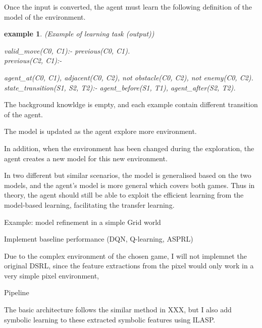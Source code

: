 \documentclass[12pt,twoside]{report}
\newtheorem{examp}{example}[section]
\begin{document}
Once the input is converted, the agent must learn the following definition of the model of the environment.

\begin{examp} (Example of learning task (output))

valid\_move(C0, C1):- previous(C0, C1).
\\
previous(C2, C1):-

agent\_at(C0, C1),
adjacent(C0, C2),
not obstacle(C0, C2),
not enemy(C0, C2).
\\
state\_transition(S1, S2, T2):-
  agent\_before(S1, T1),
  agent\_after(S2, T2).

\end{examp}
\label{learning_task}

The background knowldge is empty, and each example contain different transition of the agent.

The model is updated as the agent explore more environment.


In addition, when the environment has been changed during the exploration, the agent creates a new model for this new environment.


In two different but similar scenarios, the model is generalised based on the two models, and the agent's model is more general which covers both games. Thus in theory, the agent should still be able to exploit the efficient learning from the model-based learning, facilitating the transfer learning.


Example: model refinement in a simple Grid world


Implement baseline performance (DQN, Q-learning, ASPRL)

Due to the complex environment of the chosen game, I will not implemnet the original DSRL, since the feature extractions from the pixel would only work in a very simple pixel environment,

Pipeline

The basic architecture follows the similar method in XXX, but I also add symbolic learning to these extracted symbolic features using ILASP.
\end{document}
